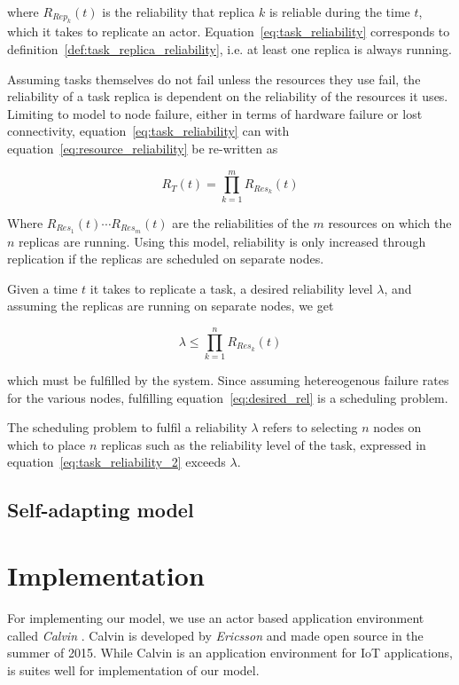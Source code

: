 \documentclass{cslthse-msc}
\begin{document}
where $R_{Rep_k}(t)$ is the reliability that replica $k$ is reliable during the time $t$, which it takes to replicate an actor. Equation~\ref{eq:task_reliability} corresponds to definition~\ref{def:task_replica_reliability}, i.e. at least one replica is always running.

Assuming tasks themselves do not fail unless the resources they use fail, the reliability of a task replica is dependent on the reliability of the resources it uses. Limiting to model to node failure, either in terms of hardware failure or lost connectivity, equation~\ref{eq:task_reliability} can with equation~\ref{eq:resource_reliability} be re-written as

\begin{equation} \label{eq:task_reliability_2}
R_{T}(t) = \prod\limits_{k=1}^m  R_{Res_k}(t)
\end{equation}

Where $R_{Res_1}(t) \cdots R_{Res_m}(t)$ are the reliabilities of the $m$ resources on which the $n$ replicas are running. Using this model, reliability is only increased through replication if the replicas are scheduled on separate nodes.

Given a time $t$ it takes to replicate a task, a desired reliability level $\lambda$, and assuming the replicas are running on separate nodes, we get

\begin{equation} \label{eq:desired_rel}
\lambda \leq \prod\limits_{k=1}^n  R_{Res_k}(t)
\end{equation}

which must be fulfilled by the system. Since assuming hetereogenous failure rates for the various nodes, fulfilling equation~\ref{eq:desired_rel} is a scheduling problem.

The scheduling problem to fulfil a reliability $\lambda$ refers to selecting $n$ nodes on which to place $n$ replicas such as the reliability level of the task, expressed in equation~\ref{eq:task_reliability_2} exceeds $\lambda$.

\subsection{Self-adapting model}


\section{Implementation} \label{sec:implementation}
For implementing our model, we use an actor based application environment called \emph{Calvin} \cite{calvin}. Calvin is developed by \emph{Ericsson} and made open source in the summer of 2015. While Calvin is an application environment for IoT applications, is suites well for implementation of our model.
\end{document}
